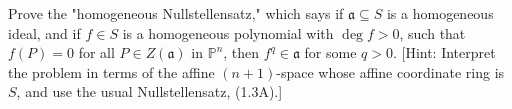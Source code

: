 Prove the "homogeneous Nullstellensatz," which says if $\mathfrak{a} \subseteq S$ is a homogeneous ideal, and if $f \in S$ is a homogeneous polynomial with $\deg f > 0$, such that $f(P) = 0$ for all $P \in Z(\mathfrak{a})$ in $\mathbb{P}^n$, then $f^q \in \mathfrak{a}$ for some $q > 0$. [Hint: Interpret the problem in terms of the affine $(n+1)$-space whose affine coordinate ring is $S$, and use the usual Nullstellensatz, (1.3A).]